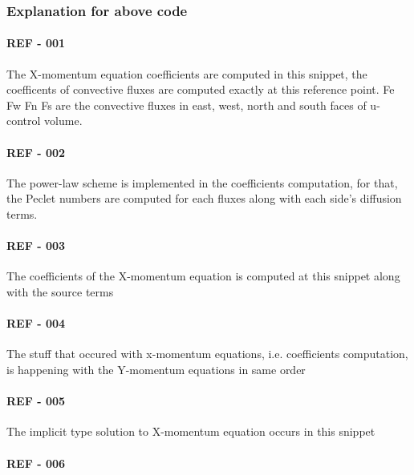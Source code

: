 \documentclass[11pt]{article}
\begin{document}
    \subsubsection{Explanation for above
code}\label{explanation-for-above-code}

    \paragraph{REF - 001}\label{ref---001}

    The X-momentum equation coefficients are computed in this snippet, the
coefficents of convective fluxes are computed exactly at this reference
point. Fe Fw Fn Fs are the convective fluxes in east, west, north and
south faces of u-control volume.

    \paragraph{REF - 002}\label{ref---002}

    The power-law scheme is implemented in the coefficients computation, for
that, the Peclet numbers are computed for each fluxes along with each
side's diffusion terms.

    \paragraph{REF - 003}\label{ref---003}

    The coefficients of the X-momentum equation is computed at this snippet
along with the source terms

    \paragraph{REF - 004}\label{ref---004}

    The stuff that occured with x-momentum equations, i.e. coefficients
computation, is happening with the Y-momentum equations in same order

    \paragraph{REF - 005}\label{ref---005}

    The implicit type solution to X-momentum equation occurs in this snippet

    \paragraph{REF - 006}\label{ref---006}
\end{document}
